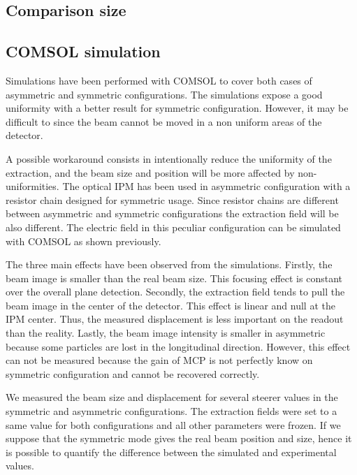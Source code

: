 \begin{refsection}
  \subsection{Comparison size}
  
  \subsection{COMSOL simulation}
  Simulations have been performed with COMSOL to cover both cases of asymmetric and symmetric configurations. The simulations expose a good uniformity with a  better result for symmetric configuration. However, it may be difficult to since the beam cannot be moved in a non uniform areas of the detector.

  A possible workaround consists in intentionally reduce the uniformity of the extraction, and the beam size and position will be more affected by non-uniformities. The optical IPM has been used in asymmetric configuration with a resistor chain designed for symmetric usage. Since resistor chains are different between asymmetric and symmetric configurations the extraction field will be also different. The electric field in this peculiar configuration can be simulated with COMSOL as shown previously.

  The three main effects have been observed from the simulations. Firstly, the beam image is smaller than the real beam size. This focusing effect is constant over the overall plane detection. Secondly, the extraction field tends to pull the beam image in the center of the detector. This effect is linear and null at the IPM center. Thus, the measured displacement is less important on the readout than the reality. Lastly, the beam image intensity is smaller in asymmetric because some particles are lost in the longitudinal direction. However, this effect can not be measured because the gain of MCP is not perfectly know on symmetric configuration and cannot be recovered correctly.

  We measured the beam size and displacement for several steerer values in the symmetric and asymmetric configurations.
  The extraction fields were set to a same value for both configurations and all other parameters were frozen. If we suppose that the symmetric mode gives the real beam position and size, hence it is possible to quantify the difference between the simulated and experimental values.

  


\end{refsection}
